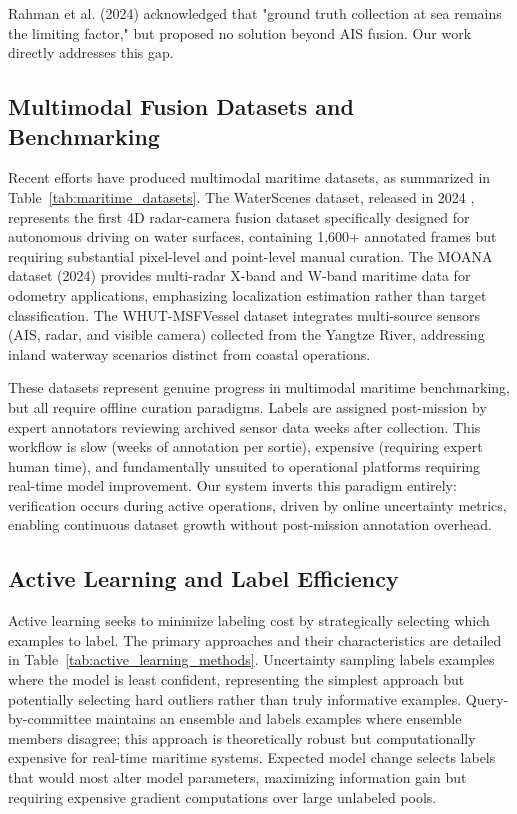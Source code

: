 \documentclass[conf]{asmeconf}
\begin{document}
Rahman et al. (2024) \cite{Rahman2024RadarClassification} acknowledged that "ground truth collection at sea remains the limiting factor," but proposed no solution beyond AIS fusion. Our work directly addresses this gap.

\subsection{Multimodal Fusion Datasets and Benchmarking}

Recent efforts have produced multimodal maritime datasets, as summarized in Table~\ref{tab:maritime_datasets}. The WaterScenes dataset, released in 2024 \cite{Zhang2024WaterScenes}, represents the first 4D radar-camera fusion dataset specifically designed for autonomous driving on water surfaces, containing 1,600+ annotated frames but requiring substantial pixel-level and point-level manual curation. The MOANA dataset (2024) \cite{Park2024MOANARadar} provides multi-radar X-band and W-band maritime data for odometry applications, emphasizing localization estimation rather than target classification. The WHUT-MSFVessel dataset integrates multi-source sensors (AIS, radar, and visible camera) collected from the Yangtze River, addressing inland waterway scenarios distinct from coastal operations.

These datasets represent genuine progress in multimodal maritime benchmarking, but all require offline curation paradigms. Labels are assigned post-mission by expert annotators reviewing archived sensor data weeks after collection. This workflow is slow (weeks of annotation per sortie), expensive (requiring expert human time), and fundamentally unsuited to operational platforms requiring real-time model improvement. Our system inverts this paradigm entirely: verification occurs during active operations, driven by online uncertainty metrics, enabling continuous dataset growth without post-mission annotation overhead.

\subsection{Active Learning and Label Efficiency}

Active learning seeks to minimize labeling cost by strategically selecting which examples to label. The primary approaches and their characteristics are detailed in Table~\ref{tab:active_learning_methods}. Uncertainty sampling labels examples where the model is least confident, representing the simplest approach but potentially selecting hard outliers rather than truly informative examples. Query-by-committee maintains an ensemble and labels examples where ensemble members disagree; this approach is theoretically robust but computationally expensive for real-time maritime systems. Expected model change selects labels that would most alter model parameters, maximizing information gain but requiring expensive gradient computations over large unlabeled pools.
\end{document}
